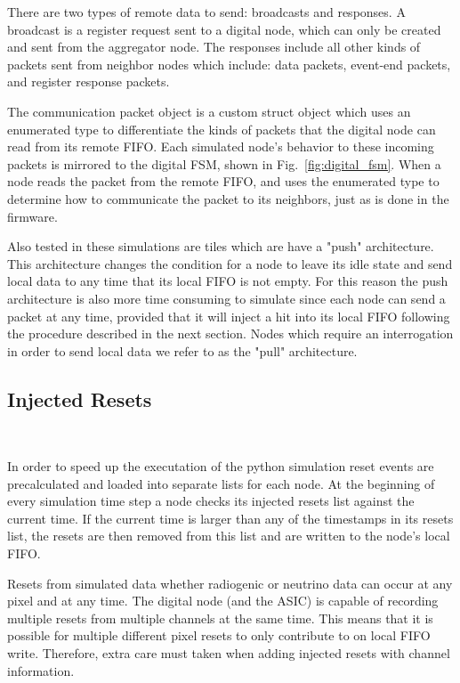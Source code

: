 There are two types of remote data to send: broadcasts and responses.
A broadcast is a register request sent to a digital node, which can only be created and sent from the aggregator node.
The responses include all other kinds of packets sent from neighbor nodes which include: data packets, event-end packets, and register response packets.

The communication packet object is a custom struct object which uses an enumerated type to differentiate the kinds of packets that the digital node can read from its remote FIFO.
Each simulated node's behavior to these incoming packets is mirrored to the digital FSM, shown in Fig.~\ref{fig:digital_fsm}.
When a node reads the packet from the remote FIFO, and uses the enumerated type to determine how to communicate the packet to its neighbors, just as is done in the firmware.

Also tested in these simulations are tiles which are have a "push" architecture.
This architecture changes the condition for a node to leave its idle state and send local data to any time that its local FIFO is not empty.
For this reason the push architecture is also more time consuming to simulate since each node can send a packet at any time, provided that it will inject a hit into its local FIFO following the procedure described in the next section.
Nodes which require an interrogation in order to send local data we refer to as the "pull" architecture.

\subsection{Injected Resets}~\label{sec:hits}

In order to speed up the executation of the python simulation reset events are precalculated and loaded into separate lists for each node.
At the beginning of every simulation time step a node checks its injected resets list against the current time.
If the current time is larger than any of the timestamps in its resets list, the resets are then removed from this list and are written to the node's local FIFO.

Resets from simulated data whether radiogenic or neutrino data can occur at any pixel and at any time.
The digital node (and the ASIC) is capable of recording multiple resets from multiple channels at the same time.
This means that it is possible for multiple different pixel resets to only contribute to on local FIFO write.
Therefore, extra care must taken when adding injected resets with channel information.

